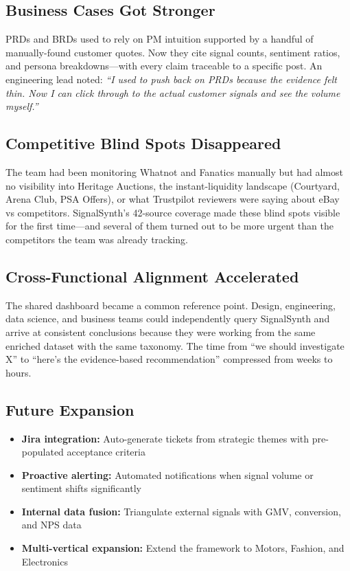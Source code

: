 \documentclass[11pt]{article}
\begin{document}
\subsection{Business Cases Got Stronger}
PRDs and BRDs used to rely on PM intuition supported by a handful of manually-found customer quotes. Now they cite signal counts, sentiment ratios, and persona breakdowns---with every claim traceable to a specific post. An engineering lead noted: \textit{``I used to push back on PRDs because the evidence felt thin. Now I can click through to the actual customer signals and see the volume myself.''}

\subsection{Competitive Blind Spots Disappeared}
The team had been monitoring Whatnot and Fanatics manually but had almost no visibility into Heritage Auctions, the instant-liquidity landscape (Courtyard, Arena Club, PSA Offers), or what Trustpilot reviewers were saying about eBay vs competitors. SignalSynth's 42-source coverage made these blind spots visible for the first time---and several of them turned out to be more urgent than the competitors the team was already tracking.

\subsection{Cross-Functional Alignment Accelerated}
The shared dashboard became a common reference point. Design, engineering, data science, and business teams could independently query SignalSynth and arrive at consistent conclusions because they were working from the same enriched dataset with the same taxonomy. The time from ``we should investigate X'' to ``here's the evidence-based recommendation'' compressed from weeks to hours.

\subsection{Future Expansion}
\begin{itemize}[nosep]
    \item \textbf{Jira integration:} Auto-generate tickets from strategic themes with pre-populated acceptance criteria
    \item \textbf{Proactive alerting:} Automated notifications when signal volume or sentiment shifts significantly
    \item \textbf{Internal data fusion:} Triangulate external signals with GMV, conversion, and NPS data
    \item \textbf{Multi-vertical expansion:} Extend the framework to Motors, Fashion, and Electronics
\end{itemize}
\end{document}
